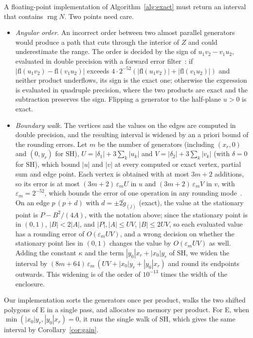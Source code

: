 \documentclass[11pt]{article}
\newcommand{\seg}[2]{\overline{#1\,#2}}
\theoremstyle{definition}
\newcommand{\eps}{\varepsilon}
\newcommand{\rng}{\operatorname{rng}}
\begin{document}
A floating-point implementation of Algorithm~\ref{alg:exact} must return an interval that contains $\rng N$. Two points need care.
\begin{itemize}
\item \emph{Angular order.} An incorrect order between two almost parallel generators would produce a path that cuts through the interior of $Z$ and could underestimate the range. The order is decided by the sign of $u_1v_2-v_1u_2$, evaluated in double precision with a forward error filter~\cite{shewchuk1997adaptive}: if $|\mathrm{fl}(u_1v_2)-\mathrm{fl}(v_1u_2)|$ exceeds $4\cdot2^{-52}(|\mathrm{fl}(u_1v_2)|+|\mathrm{fl}(v_1u_2)|)$ and neither product underflows, its sign is the exact one; otherwise the expression is evaluated in quadruple precision, where the two products are exact and the subtraction preserves the sign. Flipping a generator to the half-plane $u>0$ is exact.
\item \emph{Boundary walk.} The vertices and the values on the edges are computed in double precision, and the resulting interval is widened by an a priori bound of the rounding errors. Let $m$ be the number of generators (including $(x_r,0)$ and $(0,y_r)$ for SH), $U=|\delta_1|+3\sum_k|u_k|$ and $V=|\delta_2|+3\sum_k|v_k|$ (with $\delta=0$ for SH), which bound $|u|$ and $|v|$ at every computed or exact vertex, partial sum and edge point. Each vertex is obtained with at most $3m+2$ additions, so its error is at most $(3m+2)\,\eps_m U$ in $u$ and $(3m+2)\,\eps_m V$ in $v$, with $\eps_m=2^{-52}$, which bounds the error of one operation in any rounding mode~\cite{higham2002accuracy}. On an edge $\seg{p}{(p+d)}$ with $d=\pm2\tilde g_{(j)}$ (exact), the value at the stationary point is $P-B^2/(4A)$, with the notation above; since the stationary point is in $(0,1)$, $|B|<2|A|$, and $|P|,|A|\le UV$, $|B|\le2UV$, so each evaluated value has a rounding error of $O(\eps_m UV)$, and a wrong decision on whether the stationary point lies in $(0,1)$ changes the value by $O(\eps_m UV)$ as well. Adding the constant $\kappa$ and the term $|y_0|x_r+|x_0|y_r$ of SH, we widen the interval by $(8m+64)\,\eps_m\,(UV+|x_0|y_r+|y_0|x_r)$ and round its endpoints outwards. This widening is of the order of $10^{-13}$ times the width of the enclosure.
\end{itemize}
Our implementation sorts the generators once per product, walks the two shifted polygons of E in a single pass, and allocates no memory per product. For E, when $\min(|x_0|y_r,|y_0|x_r)=0$, it runs the single walk of SH, which gives the same interval by Corollary~\ref{cor:gain}.
\end{document}
